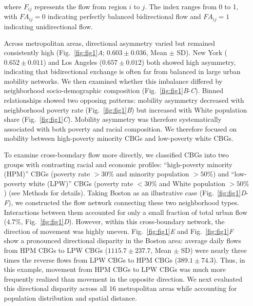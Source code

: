 \documentclass[9pt,twocolumn,twoside]{pnas-new}
\begin{document}
\noindent where $F_{ij}$ represents the flow from region $i$ to $j$. The index ranges from 0 to 1, with $FA_{ij}=0$ indicating perfectly balanced bidirectional flow and $FA_{ij}=1$ indicating unidirectional flow.

Across metropolitan areas, directional asymmetry varied but remained consistently high (Fig.~\ref{fig:fig1}\textit{A}; $0.603 \pm 0.036$, Mean $\pm$ SD). New York ($0.652 \pm 0.011$) and Los Angeles ($0.657 \pm 0.012$) both showed high asymmetry, indicating that bidirectional exchange is often far from balanced in large urban mobility networks. We then examined whether this imbalance differed by neighborhood socio-demographic composition (Fig.~\ref{fig:fig1}\textit{B}-\textit{C}). Binned relationships showed two opposing patterns: mobility asymmetry decreased with neighborhood poverty rate (Fig.~\ref{fig:fig1}\textit{B}) but increased with White population share (Fig.~\ref{fig:fig1}\textit{C}). Mobility asymmetry was therefore systematically associated with both poverty and racial composition. We therefore focused on mobility between high-poverty minority CBGs and low-poverty white CBGs.

To examine cross-boundary flow more directly, we classified CBGs into two groups with contrasting racial and economic profiles: ``high-poverty minority (HPM)'' CBGs (poverty rate $>30\%$ and minority population $>50\%$) and ``low-poverty white (LPW)'' CBGs (poverty rate $<30\%$ and White population $>50\%$) (see Methods for details). Taking Boston as an illustrative case (Fig.~\ref{fig:fig1}\textit{D}-\textit{F}), we constructed the flow network connecting these two neighborhood types. Interactions between them accounted for only a small fraction of total urban flow ($4.7\%$, Fig.~\ref{fig:fig1}\textit{D}). However, within this cross-boundary network, the direction of movement was highly uneven. Fig.~\ref{fig:fig1}\textit{E} and Fig.~\ref{fig:fig1}\textit{F} show a pronounced directional disparity in the Boston area: average daily flows from HPM CBGs to LPW CBGs ($1115.7 \pm 237.7$, Mean $\pm$ SD) were nearly three times the reverse flows from LPW CBGs to HPM CBGs ($389.1 \pm 74.3$). Thus, in this example, movement from HPM CBGs to LPW CBGs was much more frequently realized than movement in the opposite direction. We next evaluated this directional disparity across all 16 metropolitan areas while accounting for population distribution and spatial distance.
\end{document}
